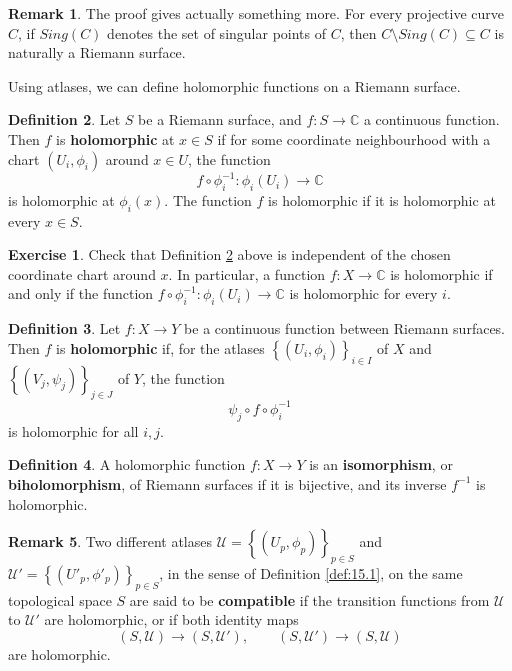\documentclass{article}
\newcommand{\C}{\mathbb{C}}
\newcommand{\rb}[1]{\left( #1 \right)}
\newcommand{\cb}[1]{\left\{ #1 \right\}}
\theoremstyle{definition}\newtheorem{definition}{Definition}[section]
\theoremstyle{definition}\newtheorem{notation}[definition]{Notation}
\theoremstyle{definition}\newtheorem{remark}[definition]{Remark}
\theoremstyle{definition}\newtheorem{example1}[definition]{Example}
\theoremstyle{definition}\newtheorem{fact}{Fact}
\theoremstyle{definition}\newtheorem{exercise}{Exercise}
\theoremstyle{definition}\newtheorem*{example2}{Example}
\begin{document}

\begin{remark}
The proof gives actually something more. For every projective curve $ C $, if $ Sing\rb{C} $ denotes the set of singular points of $ C $, then $ C \setminus Sing\rb{C} \subseteq C $ is naturally a Riemann surface.
\end{remark}

Using atlases, we can define holomorphic functions on a Riemann surface.

\begin{definition}
\label{def:15.8}
Let $ S $ be a Riemann surface, and $ f : S \to \C $ a continuous function. Then $ f $ is \textbf{holomorphic} at $ x \in S $ if for some coordinate neighbourhood with a chart $ \rb{U_i, \phi_i} $ around $ x \in U $, the function
$$ f \circ \phi_i^{-1} : \phi_i\rb{U_i} \to \C $$
is holomorphic at $ \phi_i\rb{x} $. The function $ f $ is holomorphic if it is holomorphic at every $ x \in S $.
\end{definition}

\begin{exercise}
Check that Definition \ref{def:15.8} above is independent of the chosen coordinate chart around $ x $. In particular, a function $ f : X \to \C $ is holomorphic if and only if the function $ f \circ \phi_i^{-1} : \phi_i\rb{U_i} \to \C $ is holomorphic for every $ i $.
\end{exercise}

\begin{definition}
Let $ f : X \to Y $ be a continuous function between Riemann surfaces. Then $ f $ is \textbf{holomorphic} if, for the atlases $ \cb{\rb{U_i, \phi_i}}_{i \in I} $ of $ X $ and $ \cb{\rb{V_j, \psi_j}}_{j \in J} $ of $ Y $, the function
$$ \psi_j \circ f \circ \phi_i^{-1} $$
is holomorphic for all $ i, j $.
\end{definition}

\begin{definition}
A holomorphic function $ f : X \to Y $ is an \textbf{isomorphism}, or \textbf{biholomorphism}, of Riemann surfaces if it is bijective, and its inverse $ f^{-1} $ is holomorphic.
\end{definition}

\begin{remark}
\label{rem:15.11}
Two different atlases $ \mathcal{U} = \cb{\rb{U_p, \phi_p}}_{p \in S} $ and $ \mathcal{U}' = \cb{\rb{U'_p, \phi'_p}}_{p \in S} $, in the sense of Definition \ref{def:15.1}, on the same topological space $ S $ are said to be \textbf{compatible} if the transition functions from $ \mathcal{U} $ to $ \mathcal{U}' $ are holomorphic, or if both identity maps
$$ \rb{S, \mathcal{U}} \to \rb{S, \mathcal{U}'}, \qquad \rb{S, \mathcal{U}'} \to \rb{S, \mathcal{U}} $$
are holomorphic.
\end{remark}
\end{document}
